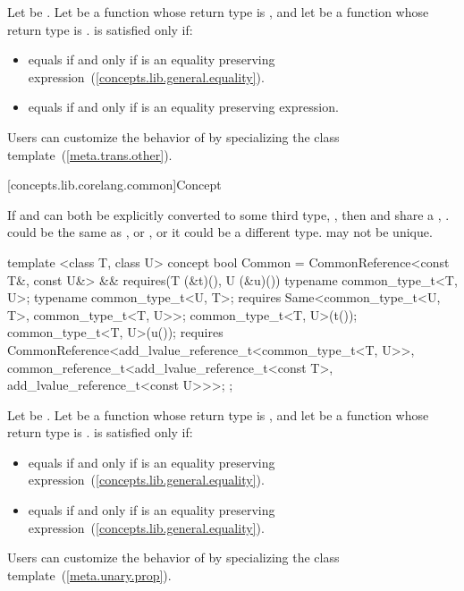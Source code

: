 \begin{itemdescr}
\pnum
Let  be . Let  be a
function whose return type is , and let  be a function
whose return type is .  is satisfied
only if:
\begin{itemize}
\item {} equals  if and only if  is an
  equality preserving expression~(\ref{concepts.lib.general.equality}).
\item {} equals  if and only if  is an
  equality preserving expression.
\end{itemize}

\pnum
\enternote Users can customize the behavior of  by specializing the
 class template~(\ref{meta.trans.other}).\exitnote
\end{itemdescr}

[concepts.lib.corelang.common]{Concept }

\pnum
If  and  can both be explicitly converted to some third type,
, then  and  share a ,
. \enternote {} could be the same as , or , or
it could be a different type.  may not be unique.\exitnote

%
\begin{itemdecl}
template <class T, class U>
concept bool Common =
  CommonReference<const T&, const U&> &&
  requires(T (&t)(), U (&u)()) {
    typename common_type_t<T, U>;
    typename common_type_t<U, T>;
    requires Same<common_type_t<U, T>, common_type_t<T, U>>;
    common_type_t<T, U>(t());
    common_type_t<T, U>(u());
    requires CommonReference<add_lvalue_reference_t<common_type_t<T, U>>,
                             common_reference_t<add_lvalue_reference_t<const T>,
                                                add_lvalue_reference_t<const U>>>;
  };
\end{itemdecl}

\begin{itemdescr}
\pnum
Let  be . Let
 be a function whose return type is , and let  be a function
whose return type is .  is satisfied only if:
\begin{itemize}
\item {} equals  if and only if
   is an equality preserving
  expression~(\ref{concepts.lib.general.equality}).
\item {} equals  if and only if
   is an equality preserving
  expression~(\ref{concepts.lib.general.equality}).
\end{itemize}

\pnum
\enternote Users can customize the behavior of  by specializing the 
class template~(\ref{meta.unary.prop}).\exitnote

\end{itemdescr}


